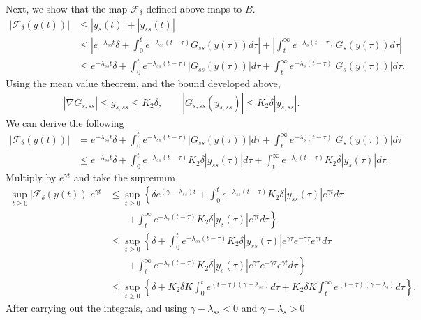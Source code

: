 \begin{solution}[9.8]
Next, we show that the map $\mathcal{F}_\delta$ defined above maps to $B$. 
\begin{align}
|\mathcal{F}_\delta(y(t))| &\leq |y_s(t)| + |y_{ss}(t)| \\
			   &\leq \left|e^{-\lambda_{ss}t}\delta + \int_{0}^t e^{-\lambda_{ss}(t-\tau)}G_{ss}(y(\tau))d\tau \right| + \left|\int_{t}^\infty e^{-\lambda_s(t-\tau)}G_s(y(\tau))d\tau\right| \\    
&\leq e^{-\lambda_{ss}t}\delta + \int_{0}^t e^{-\lambda_{ss}(t-\tau)}|G_{ss}(y(\tau))|d\tau + \int_{t}^\infty e^{-\lambda_s(t-\tau)}|G_s(y(\tau))|d\tau.
\end{align}
Using the mean value theorem, and the bound developed above, 
\begin{align}
|\nabla G_{s,ss}| \leq g_{s,ss} \leq K_2\delta, \qquad |G_{s,ss}(y_{s,ss})| \leq  K_2\delta |y_{s,ss}|.
\end{align}
We can derive the following
\begin{align}
|\mathcal{F}_\delta(y(t))| &= e^{-\lambda_{ss}t}\delta + \int_{0}^t e^{-\lambda_{ss}(t-\tau)}|G_{ss}(y(\tau))|d\tau + \int_{t}^\infty e^{-\lambda_s(t-\tau)}|G_s(y(\tau))|d\tau \\
 &\leq e^{-\lambda_{ss}t}\delta + \int_{0}^t e^{-\lambda_{ss}(t-\tau)}K_2 \delta |y_{ss}(\tau)|d\tau + \int_{t}^\infty e^{-\lambda_s(t-\tau)}K_2 \delta |y_s(\tau )|d\tau. 
\end{align}
Multiply by $e^{\gamma t}$ and take the supremum
\begin{align}
\sup_{t\geq 0}|\mathcal{F}_\delta(y(t))|e^{\gamma t} &\leq \sup_{t\geq 0} \left \{ \delta e^{(\gamma -\lambda_{ss}) t}  + \int_{0}^t e^{-\lambda_{ss}(t-\tau)}K_2 \delta |y_{ss}(\tau)|e^{\gamma t}d\tau \right.\\
						     &\qquad \left.+ \int_{t}^\infty e^{-\lambda_s(t-\tau)}K_2 \delta |y_s(\tau )|e^{\gamma t}d\tau \right \}   \\
& \leq \sup_{t\geq 0} \left \{ \delta + \int_{0}^t e^{-\lambda_{ss}(t-\tau)}K_2 \delta |y_{ss}(\tau)|e^{\gamma \tau} e^{-\gamma \tau }e^{\gamma t}d\tau \right.\\
&\qquad \left.+ \int_{t}^\infty e^{-\lambda_s(t-\tau)}K_2 \delta |y_s(\tau )|e^{\gamma \tau} e^{-\gamma \tau }e^{\gamma t}d\tau\right \} \\
&\leq \sup_{t\geq 0} \left \{ \delta +  K_2 \delta K\int_{0}^t e^{(t-\tau)(\gamma - \lambda_{ss})} d\tau +  K_2 \delta K\int_{t}^\infty e^{(t-\tau)(\gamma - \lambda_s)} d\tau\right \}.
\end{align}
After carrying out the integrals, and using $\gamma -\lambda_{ss} < 0$ and $\gamma-\lambda_s> 0$

\end{solution}
